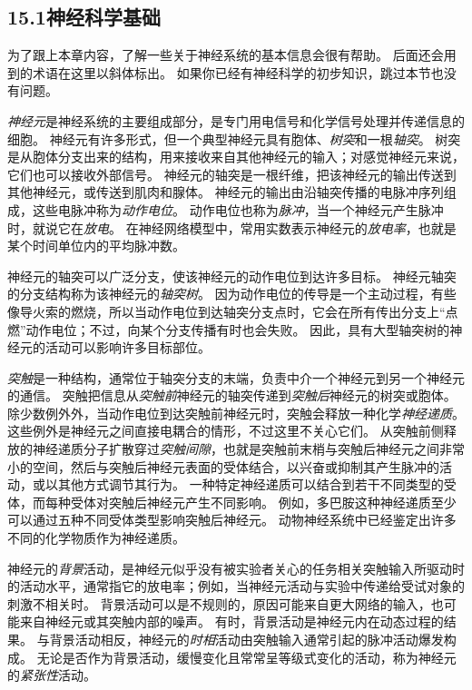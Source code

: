 \documentclass[UTF8, 12pt, fontset=fandol, oneside]{ctexart}
\begin{document}
\subsection*{15.1\quad 神经科学基础}

为了跟上本章内容，了解一些关于神经系统的基本信息会很有帮助。
后面还会用到的术语在这里以斜体标出。
如果你已经有神经科学的初步知识，跳过本节也没有问题。

\emph{神经元}是神经系统的主要组成部分，是专门用电信号和化学信号处理并传递信息的细胞。
神经元有许多形式，但一个典型神经元具有胞体、\emph{树突}和一根\emph{轴突}。
树突是从胞体分支出来的结构，用来接收来自其他神经元的输入；对感觉神经元来说，它们也可以接收外部信号。
神经元的轴突是一根纤维，把该神经元的输出传送到其他神经元，或传送到肌肉和腺体。
神经元的输出由沿轴突传播的电脉冲序列组成，这些电脉冲称为\emph{动作电位}。
动作电位也称为\emph{脉冲}，当一个神经元产生脉冲时，就说它在\emph{放电}。
在神经网络模型中，常用实数表示神经元的\emph{放电率}，也就是某个时间单位内的平均脉冲数。

神经元的轴突可以广泛分支，使该神经元的动作电位到达许多目标。
神经元轴突的分支结构称为该神经元的\emph{轴突树}。
因为动作电位的传导是一个主动过程，有些像导火索的燃烧，所以当动作电位到达轴突分支点时，它会在所有传出分支上“点燃”动作电位；不过，向某个分支传播有时也会失败。
因此，具有大型轴突树的神经元的活动可以影响许多目标部位。

\emph{突触}是一种结构，通常位于轴突分支的末端，负责中介一个神经元到另一个神经元的通信。
突触把信息从\emph{突触前}神经元的轴突传递到\emph{突触后}神经元的树突或胞体。
除少数例外外，当动作电位到达突触前神经元时，突触会释放一种化学\emph{神经递质}。
这些例外是神经元之间直接电耦合的情形，不过这里不关心它们。
从突触前侧释放的神经递质分子扩散穿过\emph{突触间隙}，也就是突触前末梢与突触后神经元之间非常小的空间，然后与突触后神经元表面的受体结合，以兴奋或抑制其产生脉冲的活动，或以其他方式调节其行为。
一种特定神经递质可以结合到若干不同类型的受体，而每种受体对突触后神经元产生不同影响。
例如，多巴胺这种神经递质至少可以通过五种不同受体类型影响突触后神经元。
动物神经系统中已经鉴定出许多不同的化学物质作为神经递质。

神经元的\emph{背景}活动，是神经元似乎没有被实验者关心的任务相关突触输入所驱动时的活动水平，通常指它的放电率；例如，当神经元活动与实验中传递给受试对象的刺激不相关时。
背景活动可以是不规则的，原因可能来自更大网络的输入，也可能来自神经元或其突触内部的噪声。
有时，背景活动是神经元内在动态过程的结果。
与背景活动相反，神经元的\emph{时相}活动由突触输入通常引起的脉冲活动爆发构成。
无论是否作为背景活动，缓慢变化且常常呈等级式变化的活动，称为神经元的\emph{紧张性}活动。
\end{document}
